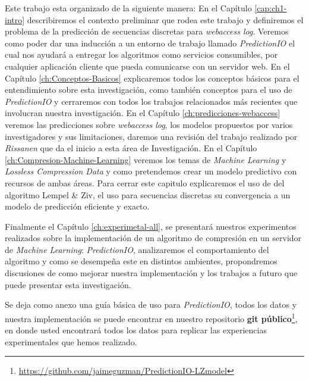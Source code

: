 
Este trabajo esta organizado de la siguiente manera: En el Capítulo \ref{cap:ch1-intro} describiremos el contexto preliminar que rodea este trabajo y definiremos el problema de la predicción de secuencias discretas para \emph{webaccess log}. Veremos como poder dar una inducción a un entorno de trabajo llamado \emph{PredictionIO} el cual nos ayudará a entregar los algoritmos como servicios consumibles, por cualquier aplicación cliente que pueda comunicarse con un servidor web.
En el Capítulo \ref{ch:Conceptos-Basicos} explicaremos todos los conceptos básicos para el entendimiento sobre esta investigación, como también conceptos para el uso de \emph{PredictionIO} y cerraremos con todos los trabajos relacionados más recientes que involucran nuestra investigación. En el Capítulo \ref{ch:predicciones-webaccess} veremos las predicciones sobre \emph{webaccess log}, los modelos propuestos por varios investigadores y sus limitaciones, daremos una revisión del trabajo realizado por \emph{Rissanen}\cite{Rissanen1984} que da el inicio a esta área de Investigación.
En el Capítulo \ref{ch:Compresion-Machine-Learning} veremos los temas de \emph{Machine Learning} y \emph{Lossless Compression Data} y como pretendemos crear un modelo predictivo con recursos de ambas áreas. Para cerrar este capitulo explicaremos el uso de del algoritmo Lempel \& Ziv, el uso para secuencias discretas su convergencia a un modelo de predicción eficiente y exacto. 

Finalmente el Capítulo \ref{ch:experimetal-all}, se presentará nuestros experimentos realizados sobre la implementación de un algoritmo de compresión en un servidor de \emph{Machine Learning}: \emph{PredictionIO}, analizaremos el comportamiento del algoritmo y como se desempeña este en distintos ambientes, propondremos discusiones de como mejorar nuestra implementación y los trabajos a futuro que puede presentar esta investigación.

Se deja como anexo una guía básica de uso para \emph{PredictionIO}, todos los datos y nuestra implementación se puede encontrar en nuestro repositorio \textbf{git público}\footnote{\url{https://github.com/jaimeguzman/PredictionIO-LZmodel}}, en donde usted encontrará todos los datos para replicar las experiencias experimentales que hemos realizado. 

